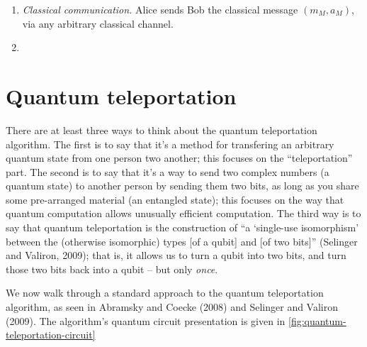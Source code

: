 \documentclass[12pt]{amsart}
\begin{document}
{\begin{enumerate}
  \item \emph{Classical communication.}  Alice sends Bob the classical message
    $(m_M,a_M)$, via any arbitrary classical channel.

  \item {} 
\end{enumerate}

\section{Quantum teleportation}\label{sec:teleportation}

There are at least three ways to think about the quantum teleportation
algorithm.  The first is to say that it's a method for transfering an arbitrary
quantum state from one person two another; this focuses on the ``teleportation''
part.  The second is to say that it's a way to send two complex numbers (a
quantum state) to another person by sending them two bits, as long as you share
some pre-arranged material (an entangled state); this focuses on the way that
quantum computation allows unusually efficient computation.  The third way is to
say that quantum teleportation is the construction of ``a `single-use
isomorphism' between the (otherwise isomorphic) types [of a qubit] and [of two
bits]''  (Selinger and Valiron, 2009); that is, it
allows us to turn a qubit into two bits, and turn those two bits back into a
qubit – but only \emph{once}.

We now walk through a standard approach to the quantum teleportation algorithm,
as seen in Abramsky and Coecke (2008) and Selinger and Valiron (2009).  The algorithm's quantum circuit presentation is given in
\cref{fig:quantum-teleportation-circuit}

\begin{figure}
\def\Qm{0}
\def\Qa{-2}
\def\Qb{-4}
\end{figure}}
\end{document}

